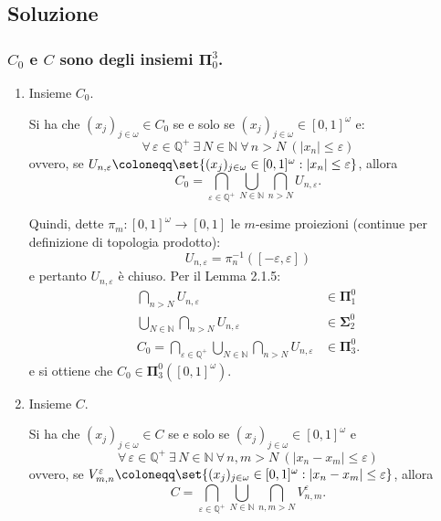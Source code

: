 \documentclass{article}
\newcommand{\1}{\mathds{1}}
\newcommand{\Q}{\mathds{Q}}
\newcommand{\N}{\mathds{N}}
\begin{document}
\subsection{Soluzione}
\label{sec:orgf63820f}

\subsubsection{\(C_{0}\) e \(C\) sono degli insiemi \(\mathbf{\Pi}_{0}^{3}\).}
\label{sec:org02e4c78}

\begin{enumerate}
\item Insieme \(C_{0}\).
\label{sec:org92a6d31}

Si ha che \((x_{j})_{j \in \omega} \in C_{0}\) se e solo se \((x_{j})_{j \in \omega} \in [0,1]^{\omega}\) e:
\begin{equation*}
	\forall\, \varepsilon \in \Q^{+}\ \exists\,N \in \N \ \forall\, n > N\ \left( |x_{n}|\le\varepsilon\right)
\end{equation*}
ovvero, se \(U_{n, \varepsilon} \coloneqq \set{(x_{j})_{j \in \omega} \in [0,1]^{\omega}: |x_{n}|\le\varepsilon}\), allora
\begin{equation*}
	C_{0} = \bigcap_{\varepsilon \in \Q^{+}} \bigcup_{N \in \N} \bigcap_{n>N} U_{n,\varepsilon}.
\end{equation*}

Quindi, dette \(\pi_{m} : [0,1]^{\omega}\to [0,1]\) le \(m\)-esime proiezioni (continue per definizione di topologia prodotto):
\begin{equation*}
	U_{n,\varepsilon}= \pi_{n}^{-1}\left([-\varepsilon,\varepsilon]\right)
\end{equation*}
e pertanto \(U_{n,\varepsilon}\) è chiuso. Per il Lemma 2.1.5:
\begin{align*}
	\bigcap_{n > N} U_{n,\varepsilon} &\in \bm{\Pi}_{1}^{0}\\
	\bigcup_{N \in \N}\bigcap_{n >N} U_{n,\varepsilon} &\in \bm{\Sigma}_{2}^{0}\\
	C_{0} = \bigcap_{\varepsilon \in \Q^{+}} \bigcup_{N \in \N} \bigcap_{n>N} U_{n,\varepsilon} &\in \bm{\Pi}_{3}^{0}.
\end{align*}
e si ottiene che \(C_{0} \in \bm{\Pi}_{3}^{0}\left([0,1]^{\omega}\right)\).
\item Insieme \(C\).
\label{sec:orgbb6026c}

Si ha che \((x_{j})_{j \in\omega} \in C\) se e solo se \((x_{j})_{j \in\omega} \in [0,1]^{\omega}\) e
\begin{equation*}
\forall\, \varepsilon \in \Q^{+}\ \exists\, N \in \N \ \forall\,n,m> N\ (|x_{n}-x_{m}|\le\varepsilon)
\end{equation*}
ovvero, se \(V_{m,n}^{\varepsilon} \coloneqq \set{(x_{j})_{j \in \omega} \in [0,1]^{\omega}: |x_{n}-x_{m}|\le\varepsilon}\), allora
\begin{equation*}
C = \bigcap_{\varepsilon \in \Q^{+}}\bigcup_{N \in \N}\bigcap_{n,m>N} V_{n,m}^{\varepsilon}.
\end{equation*}


\end{enumerate}
\end{document}
